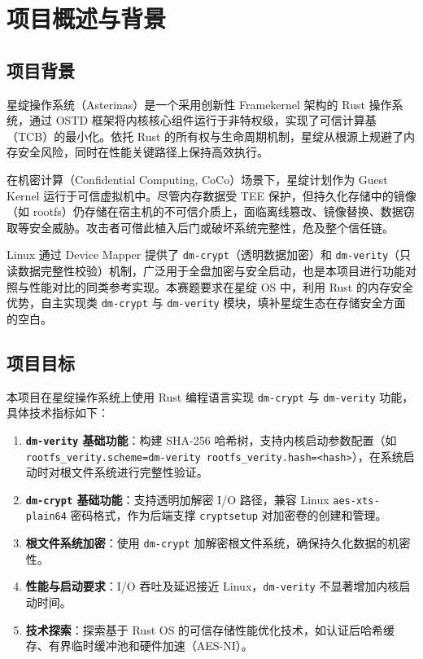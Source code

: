 \chapter{项目概述与背景}

\section{项目背景}

星绽操作系统（Asterinas）是一个采用创新性 Framekernel 架构的 Rust 操作系统，通过 OSTD 框架将内核核心组件运行于非特权级，实现了可信计算基（TCB）的最小化。依托 Rust 的所有权与生命周期机制，星绽从根源上规避了内存安全风险，同时在性能关键路径上保持高效执行。

在机密计算（Confidential Computing, CoCo）场景下，星绽计划作为 Guest Kernel 运行于可信虚拟机中。尽管内存数据受 TEE 保护，但持久化存储中的镜像（如 rootfs）仍存储在宿主机的不可信介质上，面临离线篡改、镜像替换、数据窃取等安全威胁。攻击者可借此植入后门或破坏系统完整性，危及整个信任链。

Linux 通过 Device Mapper 提供了 \texttt{dm-crypt}（透明数据加密）和 \texttt{dm-verity}（只读数据完整性校验）机制\cite{linux_dm_crypt,linux_dm_verity}，广泛用于全盘加密与安全启动，也是本项目进行功能对照与性能对比的同类参考实现。本赛题要求在星绽 OS 中，利用 Rust 的内存安全优势，自主实现类 \texttt{dm-crypt} 与 \texttt{dm-verity} 模块，填补星绽生态在存储安全方面的空白\cite{asterinas2024}。

\section{项目目标}

本项目在星绽操作系统上使用 Rust 编程语言实现 \texttt{dm-crypt} 与 \texttt{dm-verity} 功能，具体技术指标如下：

\begin{enumerate}
    \item \textbf{\texttt{dm-verity} 基础功能}：构建 SHA-256 哈希树\cite{fips180_4}，支持内核启动参数配置（如 \texttt{rootfs\_verity.scheme=dm-verity rootfs\_verity.hash=<hash>}），在系统启动时对根文件系统进行完整性验证。
    \item \textbf{\texttt{dm-crypt} 基础功能}：支持透明加解密 I/O 路径，兼容 Linux \texttt{aes-xts-plain64} 密码格式\cite{nist_sp800_38e}，作为后端支撑 \texttt{cryptsetup} 对加密卷的创建和管理\cite{cryptsetup}。
    \item \textbf{根文件系统加密}：使用 \texttt{dm-crypt} 加解密根文件系统，确保持久化数据的机密性。
    \item \textbf{性能与启动要求}：I/O 吞吐及延迟接近 Linux，\texttt{dm-verity} 不显著增加内核启动时间。
    \item \textbf{技术探索}：探索基于 Rust OS 的可信存储性能优化技术，如认证后哈希缓存、有界临时缓冲池和硬件加速（AES-NI）。
\end{enumerate}

